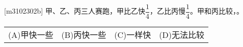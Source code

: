 [m3102302b]\quad
甲、乙、丙三人赛跑，甲比乙快$\dfrac{1}{4}$，乙比丙慢$\dfrac{1}{4}$。甲和丙比较，。 \par
\hspace{7em}
\begin{tabular}{llll}
    (A)\quad 甲快一些 &
    (B)\quad 丙快一些 &
    (C)\quad 一样快 &
    (D)\quad 无法比较
\end{tabular}
\par